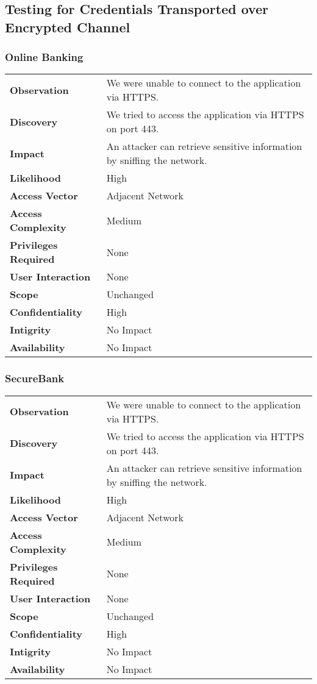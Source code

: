 \subsection{Testing for Credentials Transported over Encrypted Channel}

\subsubsection*{Online Banking}

\begin{tabular}{l|p{10cm}}

\textbf{Observation} & We were unable to connect to the application via HTTPS.  \\
\textbf{Discovery} & We tried to access the application via HTTPS on port 443. \\
\textbf{Impact} & An attacker can retrieve sensitive information by sniffing the network. \\
\textbf{Likelihood} & High \\
\textbf{Access Vector} & Adjacent Network \\
\textbf{Access Complexity} & Medium \\
\textbf{Privileges Required} & None \\
\textbf{User Interaction} & None \\
\textbf{Scope} & Unchanged \\
\textbf{Confidentiality} & High \\
\textbf{Intigrity} & No Impact \\
\textbf{Availability} & No Impact \\
\end{tabular}

\subsubsection*{SecureBank}


\begin{tabular}{l|p{10cm}}

\textbf{Observation} & We were unable to connect to the application via HTTPS.  \\
\textbf{Discovery} & We tried to access the application via HTTPS on port 443. \\
\textbf{Impact} & An attacker can retrieve sensitive information by sniffing the network. \\
\textbf{Likelihood} & High \\
\textbf{Access Vector} & Adjacent Network \\
\textbf{Access Complexity} & Medium \\
\textbf{Privileges Required} & None \\
\textbf{User Interaction} & None \\
\textbf{Scope} & Unchanged \\
\textbf{Confidentiality} & High \\
\textbf{Intigrity} & No Impact \\
\textbf{Availability} & No Impact \\
\end{tabular}

